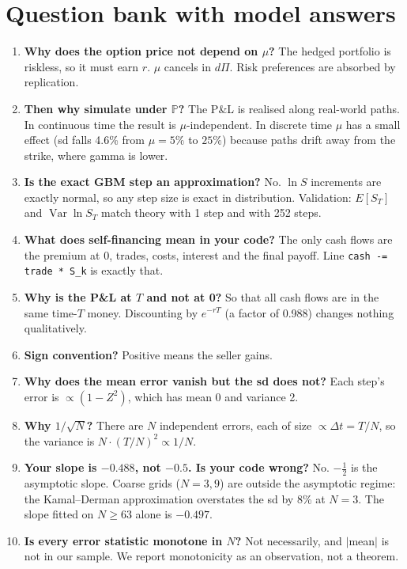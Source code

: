 \documentclass[10.5pt,a4paper]{article}
\begin{document}
\section{Question bank with model answers}
\begin{enumerate}[label=\textbf{Q\arabic*.},leftmargin=2.2em]
\item \textbf{Why does the option price not depend on $\mu$?} The hedged portfolio is riskless, so it must earn $r$. $\mu$ cancels in $d\Pi$. Risk preferences are absorbed by replication.
\item \textbf{Then why simulate under $\mathbb P$?} The P\&L is realised along real-world paths. In continuous time the result is $\mu$-independent. In discrete time $\mu$ has a small effect (sd falls 4.6\% from $\mu=5\%$ to $25\%$) because paths drift away from the strike, where gamma is lower.
\item \textbf{Is the exact GBM step an approximation?} No. $\ln S$ increments are exactly normal, so any step size is exact in distribution. Validation: $E[S_T]$ and $\operatorname{Var}\ln S_T$ match theory with 1 step and with 252 steps.
\item \textbf{What does self-financing mean in your code?} The only cash flows are the premium at 0, trades, costs, interest and the final payoff. Line \texttt{cash -= trade * S\_k} is exactly that.
\item \textbf{Why is the P\&L at $T$ and not at 0?} So that all cash flows are in the same time-$T$ money. Discounting by $e^{-rT}$ (a factor of 0.988) changes nothing qualitatively.
\item \textbf{Sign convention?} Positive means the seller gains.
\item \textbf{Why does the mean error vanish but the sd does not?} Each step's error is $\propto(1-Z^2)$, which has mean 0 and variance 2.
\item \textbf{Why $1/\sqrt N$?} There are $N$ independent errors, each of size $\propto\Delta t=T/N$, so the variance is $N\cdot(T/N)^2\propto1/N$.
\item \textbf{Your slope is $-0.488$, not $-0.5$. Is your code wrong?} No. $-\tfrac12$ is the asymptotic slope. Coarse grids ($N=3,9$) are outside the asymptotic regime: the Kamal--Derman approximation overstates the sd by 8\% at $N=3$. The slope fitted on $N\ge63$ alone is $-0.497$.
\item \textbf{Is every error statistic monotone in $N$?} Not necessarily, and $|$mean$|$ is not in our sample. We report monotonicity as an observation, not a theorem.

\end{enumerate}
\end{document}
